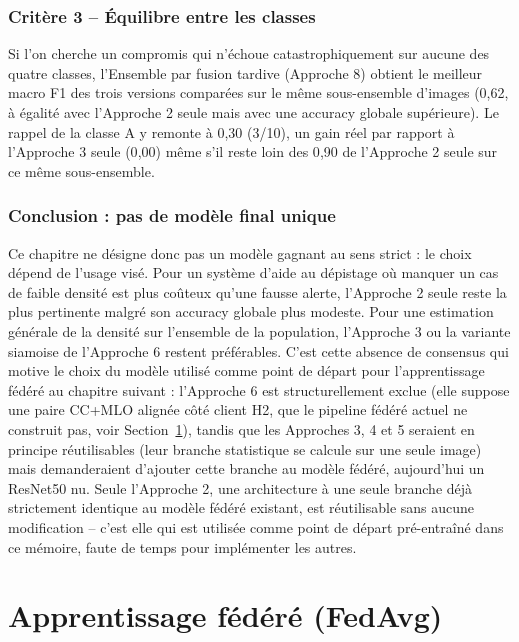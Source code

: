 \documentclass[12pt,a4paper]{report}
\begin{document}
\subsection{Critère 3 -- Équilibre entre les classes}
Si l'on cherche un compromis qui n'échoue catastrophiquement sur aucune des
quatre classes, l'Ensemble par fusion tardive (Approche 8) obtient le
meilleur macro F1 des trois versions comparées sur le même sous-ensemble
d'images (0{,}62, à égalité avec l'Approche 2 seule mais avec une accuracy
globale supérieure). Le rappel de la classe A y remonte à 0{,}30 (3/10),
un gain réel par rapport à l'Approche 3 seule (0{,}00) même s'il reste loin
des 0{,}90 de l'Approche 2 seule sur ce même sous-ensemble.

\subsection{Conclusion : pas de modèle \og{}final\fg{} unique}
Ce chapitre ne désigne donc pas un modèle \og{}gagnant\fg{} au sens
strict : le choix dépend de l'usage visé. Pour un système d'aide au
dépistage où manquer un cas de faible densité est plus coûteux qu'une
fausse alerte, l'Approche 2 seule reste la plus pertinente malgré son
accuracy globale plus modeste. Pour une estimation générale de la densité
sur l'ensemble de la population, l'Approche 3 ou la variante siamoise de
l'Approche 6 restent préférables. C'est cette absence de consensus qui
motive le choix du modèle utilisé comme point de départ pour
l'apprentissage fédéré au chapitre suivant : l'Approche 6 est
structurellement exclue (elle suppose une paire CC+MLO alignée côté client
H2, que le pipeline fédéré actuel ne construit pas, voir
Section~\ref{sec:federe}), tandis que les Approches 3, 4 et 5 seraient en
principe réutilisables (leur branche statistique se calcule sur une seule
image) mais demanderaient d'ajouter cette branche au modèle fédéré,
aujourd'hui un ResNet50 nu. Seule l'Approche 2, une architecture à une
seule branche déjà strictement identique au modèle fédéré existant, est
réutilisable sans aucune modification -- c'est elle qui est utilisée comme
point de départ pré-entraîné dans ce mémoire, faute de temps pour
implémenter les autres.

\chapter{Apprentissage fédéré (FedAvg)}
\label{sec:federe}
\end{document}
